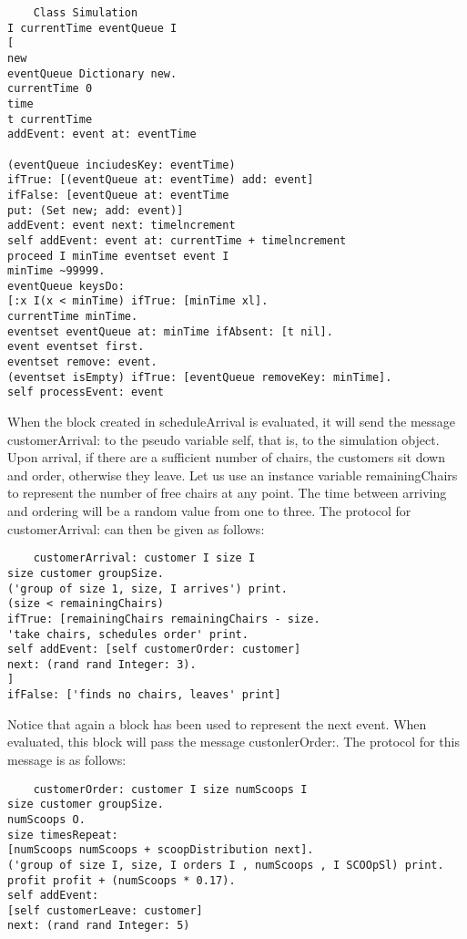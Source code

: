 \begin{lstlisting}
    Class Simulation
I currentTime eventQueue I
[
new
eventQueue Dictionary new.
currentTime 0
time
t currentTime
addEvent: event at: eventTime

(eventQueue inciudesKey: eventTime)
ifTrue: [(eventQueue at: eventTime) add: event]
ifFalse: [eventQueue at: eventTime
put: (Set new; add: event)]
addEvent: event next: timelncrement
self addEvent: event at: currentTime + timelncrement
proceed I minTime eventset event I
minTime ~99999.
eventQueue keysDo:
[:x I(x < minTime) ifTrue: [minTime xl].
currentTime minTime.
eventset eventQueue at: minTime ifAbsent: [t nil].
event eventset first.
eventset remove: event.
(eventset isEmpty) ifTrue: [eventQueue removeKey: minTime].
self processEvent: event
\end{lstlisting}

When the block created in scheduleArrival is evaluated, it will send the message
customerArrival: to the pseudo variable self, that is, to the simulation object.
Upon arrival, if there are a sufficient number of chairs, the customers sit down
and order, otherwise they leave. Let us use an instance variable remainingChairs
to represent the number of free chairs at any point. The time between arriving
and ordering will be a random value from one to three. The protocol for
customerArrival: can then be given as follows:

\begin{lstlisting}
    customerArrival: customer I size I
size customer groupSize.
('group of size 1, size, I arrives') print.
(size < remainingChairs)
ifTrue: [remainingChairs remainingChairs - size.
'take chairs, schedules order' print.
self addEvent: [self customerOrder: customer]
next: (rand rand Integer: 3).
]
ifFalse: ['finds no chairs, leaves' print]
\end{lstlisting}

Notice that again a block has been used to represent the next event. When
evaluated, this block will pass the message custonlerOrder:. The protocol for
this message is as follows:

\begin{lstlisting}
    customerOrder: customer I size numScoops I
size customer groupSize.
numScoops O.
size timesRepeat:
[numScoops numScoops + scoopDistribution next].
('group of size I, size, I orders I , numScoops , I SCOOpSl) print.
profit profit + (numScoops * 0.17).
self addEvent:
[self customerLeave: customer]
next: (rand rand Integer: 5)
\end{lstlisting}


